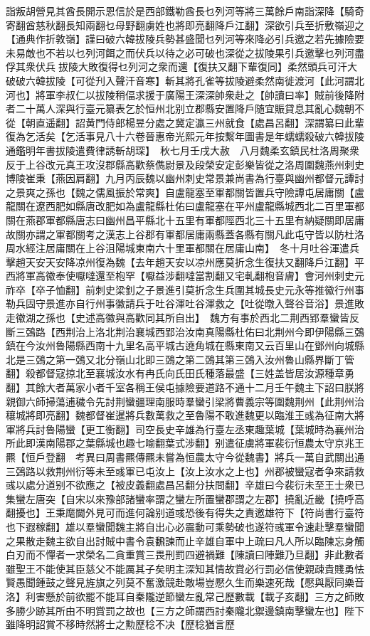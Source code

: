 詣叛胡營見其酋長開示恩信於是西部鐵勒酋長乜列河等將三萬餘戶南詣深降【騎奇寄翻酋慈秋翻長知兩翻乜母野翻虜姓也將即亮翻降戶江翻】深欲引兵至折敷嶺迎之【通典作折敦嶺】謹曰破六韓拔陵兵勢甚盛聞乜列河等來降必引兵邀之若先據險要未易敵也不若以乜列河餌之而伏兵以待之必可破也深從之拔陵果引兵邀擊乜列河盡俘其衆伏兵拔陵大敗復得乜列河之衆而還【復扶又翻下輩復同】柔然頭兵可汗大破破六韓拔陵【可從刋入聲汗音寒】斬其將孔雀等拔陵避柔然南徙渡河【此河謂北河也】將軍李叔仁以拔陵稍偪求援于廣陽王深深帥衆赴之【帥讀曰率】賊前後降附者二十萬人深與行臺元纂表乞於恒州北别立郡縣安置降戶随宜賑貸息其亂心魏朝不從【朝直遥翻】詔黄門侍郎楊昱分處之冀定瀛三州就食【處昌呂翻】深謂纂曰此輩復為乞活矣【乞活事見八十六卷晉惠帝光熙元年按繫年圖書是年蠕蠕殺破六韓拔陵通鑑明年書拔陵遣費律誘斬胡琛】　秋七月壬戌大赦　八月魏柔玄鎮民杜洛周聚衆反于上谷改元真王攻沒郡縣高歡蔡儁尉景及段榮安定彭樂皆從之洛周圍魏燕州刺史博陵崔秉【燕因肩翻】九月丙辰魏以幽州刺史常景兼尚書為行臺與幽州都督元譚討之景爽之孫也【魏之儒風振於常爽】自盧龍塞至軍都關皆置兵守險譚屯居庸關【盧龍關在遼西肥如縣唐改肥如為盧龍縣杜佑曰盧龍塞在平州盧龍縣城西北二百里軍都關在燕郡軍都縣唐志曰幽州昌平縣北十五里有軍都陘西北三十五里有納疑關即居庸故關亦謂之軍都關考之漢志上谷郡有軍都居庸兩縣蓋各縣有關凡此屯守皆以防杜洛周水經注居庸關在上谷沮陽城東南六十里軍都關在居庸山南】　冬十月吐谷渾遣兵擊趙天安天安降凉州復為魏【去年趙天安以凉州應莫折念生復扶又翻降戶江翻】平西將軍高徽奉使嚈噠還至枹罕【嚈益涉翻噠當割翻又宅軋翻枹音膚】會河州刺史元祚卒【卒子恤翻】前刺史梁釗之子景進引莫折念生兵圍其城長史元永等推徽行州事勒兵固守景進亦自行州事徽請兵于吐谷渾吐谷渾救之【吐從暾入聲谷音浴】景進敗走徽湖之孫也【史述高徽與高歡同其所自出】　魏方有事於西北二荆西郢羣蠻皆反斷三鵶路【西荆治上洛北荆治襄城西郢治汝南真陽縣杜佑曰北荆州今即伊陽縣三鵶鎮在今汝州魯陽縣西南十九里名高平城古遶角城在縣東南又云百里山在鄧州向城縣北是三鵶之第一鵶又北分嶺山北即三鵶之第二鵶其第三鵶入汝州魯山縣界斷丁管翻】殺都督寇掠北至襄城汝水有冉氏向氏田氏種落最盛【三姓盖皆居汝源種章勇翻】其餘大者萬家小者千室各稱王侯屯據險要道路不通十二月壬午魏主下詔曰朕將親御六師掃蕩逋穢令先討荆蠻疆理南服時羣蠻引梁將曹義宗等圍魏荆州【此荆州治穰城將即亮翻】魏都督崔暹將兵數萬救之至魯陽不敢進魏更以臨淮王彧為征南大將軍將兵討魯陽蠻【更工衡翻】司空長史辛雄為行臺左丞東趣葉城【葉城時為襄州治所此即漢南陽郡之葉縣城也趣七喻翻葉式涉翻】别遣征虜將軍裴衍恒農太守京兆王羆【恒戶登翻　考異曰周書羆傳羆未嘗為恒農太守今從魏書】將兵一萬自武關出通三鵶路以救荆州衍等未至彧軍已屯汝上【汝上汝水之上也】州郡被蠻寇者争來請救彧以處分道别不欲應之【被皮義翻處昌呂翻分扶問翻】辛雄曰今裴衍未至王士衆已集蠻左唐突【自宋以來豫部諸蠻率謂之蠻左所置蠻郡謂之左郡】撓亂近畿【撓呼高翻擾也】王秉麾閫外見可而進何論别道彧恐後有得失之責邀雄符下【符尚書行臺符也下遐稼翻】雄以羣蠻聞魏主將自出心必震動可乘勢破也遂符彧軍令速赴擊羣蠻聞之果散走魏主欲自出討賊中書令袁飜諫而止辛雄自軍中上疏曰凡人所以臨陳忘身觸白刃而不憚者一求榮名二貪重賞三畏刑罰四避禍難【陳讀曰陣難乃旦翻】非此數者雖聖王不能使其臣慈父不能厲其子矣明主深知其情故賞必行罰必信使親疎貴賤勇怯賢愚聞鍾鼓之聲見旌旗之列莫不奮激競赴敵場豈懕久生而樂速死哉【懕與厭同樂音洛】利害懸於前欲罷不能耳自秦隴逆節蠻左亂常己歷數載【載子亥翻】三方之師敗多勝少跡其所由不明賞罰之故也【三方之師謂西討秦隴北禦邊鎮南擊蠻左也】陛下雖降明詔賞不移時然將士之勲歷稔不决【歷稔猶言歷